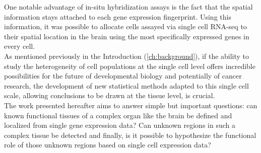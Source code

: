 One notable advantage of in-situ hybridization assays is the fact that the spatial information stays attached to each gene expression fingerprint. Using this information, it was possible to allocate cells assayed via single cell RNA-seq to their spatial location in the brain using the most specifically expressed genes in every cell. \\

As mentioned previously in the Introduction (\ref{ch:background}), if the ability to study the heterogeneity of cell populations at the single cell level offers incredible possibilities for the future of developmental biology and potentially of cancer research, the development of new statistical methods adapted to this single cell scale, allowing conclusions to be drawn at the tissue level, is crucial.\\

The work presented hereafter aims to answer simple but important questions: can known functional tissues of a complex organ like the brain be defined and localized from single gene expression data? Can unknown regions in such a complex tissue be detected and finally, is it possible to hypothesize the functional role of those unknown regions based on single cell expression data?


	
	




